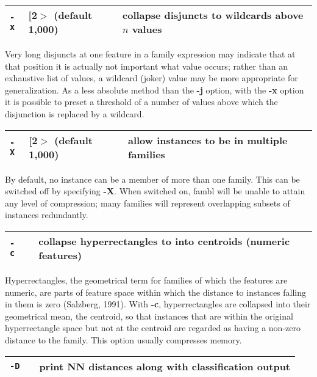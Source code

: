 \documentclass[11pt]{article}
\begin{document}
\begin{tabular}{|p{}|p{}|p{}|}
\hline
{\tt -x} & [2$>$ (default 1,000) & collapse disjuncts to wildcards above $n$ values \\
\hline
\end{tabular}

Very long disjuncts at one feature in a family expression may indicate
that at that position it is actually not important what value occurs;
rather than an exhaustive list of values, a wildcard (joker) value may
be more appropriate for generalization. As a less absolute method than
the {\bf -j} option, with the {\bf -x} option it is possible to preset
a threshold of a number of values above which the disjunction is
replaced by a wildcard.  \ \\

\begin{tabular}{|p{}|p{}|p{}|}
\hline
{\tt -X} & [2$>$ (default 1,000) & allow instances to be in multiple families \\
\hline
\end{tabular}

By default, no instance can be a member of more than one family. This
can be switched off by specifying {\bf -X}. When switched on, {\sc
  fambl} will be unable to attain any level of compression; many
families will represent overlapping subsets of instances redundantly.

\begin{tabular}{|p{}|p{}|p{}|}
\hline
{\tt -c} & & collapse hyperrectangles to into centroids (numeric features) \\
\hline
\end{tabular}

Hyperrectangles, the geometrical term for families of which the
features are numeric, are parts of feature space within which the
distance to instances falling in them is zero (Salzberg, 1991). With
{\bf -c}, hyperrectangles are collapsed into their geometrical mean,
the centroid, so that instances that are within the original
hyperrectangle space but not at the centroid are regarded as having a
non-zero distance to the family. This option usually compresses
memory. 
\ \\

\begin{tabular}{|p{}|p{}|p{}|}
\hline
{\tt -D} & & print NN distances along with classification output \\
\hline
\end{tabular}
\end{document}
